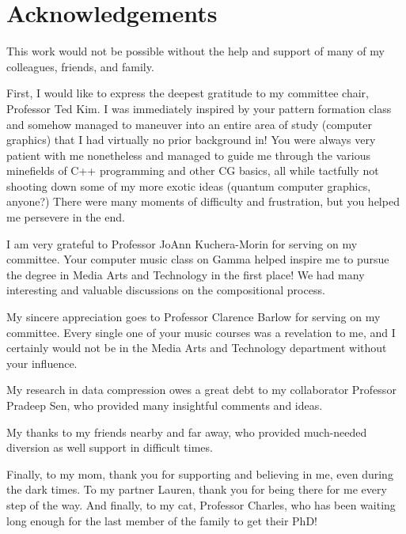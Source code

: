 \chapter*{Acknowledgements}

{\singlespace
This work would not be possible without the help and support of many of my colleagues, friends, and family.

First, I would like to express the deepest gratitude to my committee chair, Professor Ted Kim. I was immediately inspired by your pattern formation class and somehow managed to maneuver into an entire area of study (computer graphics) that I had virtually no prior background in! You were always very patient with me nonetheless and managed to guide me through the various minefields of C++ programming and other CG basics, all while tactfully not shooting down some of my more exotic ideas (quantum computer graphics, anyone?) There were many moments of difficulty and frustration, but you helped me persevere in the end.

I am very grateful to Professor JoAnn Kuchera-Morin for serving on my committee. Your computer music class on Gamma helped inspire me to pursue the degree in Media Arts and Technology in the first place! We had many interesting and valuable discussions on the compositional process. 

My sincere appreciation goes to Professor Clarence Barlow for serving on my committee. Every single one of your music courses was a revelation to me, and I certainly would not be in the Media Arts and Technology department without your influence. 

My research in data compression owes a great debt to my collaborator Professor Pradeep Sen, who provided many insightful comments and ideas.

My thanks to my friends nearby and far away, who provided much-needed diversion as well support in difficult times. 

Finally, to my mom, thank you for supporting and believing in me, even during the dark times. To my partner Lauren, thank you for being there for me every step of the way. And finally, to my cat, Professor Charles, who has been waiting long enough for the last member of the family to get their PhD!
}



